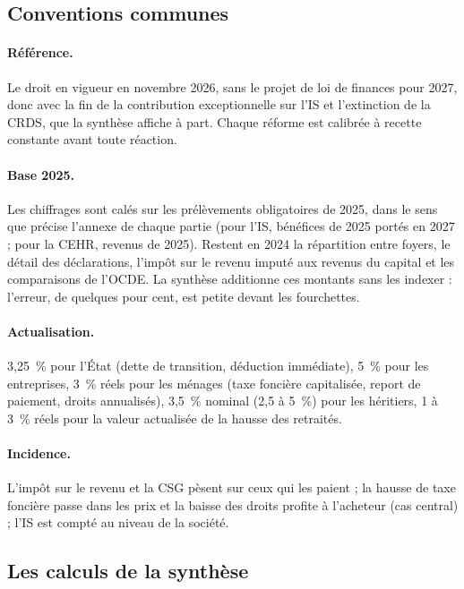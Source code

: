 \documentclass[11pt,a4paper]{article}
\begin{document}
\subsection{Conventions communes}\label{ann:meth_conv}

\paragraph{Référence.} Le droit en vigueur en novembre 2026, sans le projet de loi de finances pour 2027, donc avec la
fin de la contribution exceptionnelle sur l'IS et l'extinction de la CRDS, que la synthèse affiche à part. Chaque
réforme est calibrée à recette constante avant toute réaction.

\paragraph{Base 2025.} Les chiffrages sont calés sur les prélèvements obligatoires de 2025, dans le sens que précise
l'annexe de chaque partie (pour l'IS, bénéfices de 2025 portés en 2027 ; pour la CEHR, revenus de 2025). Restent en
2024 la répartition entre foyers, le détail des déclarations, l'impôt sur le revenu imputé aux revenus du capital et
les comparaisons de l'OCDE. La synthèse additionne ces montants sans les indexer : l'erreur, de quelques pour cent, est
petite devant les fourchettes.

\paragraph{Actualisation.} 3,25~\% pour l'État (dette de transition, déduction immédiate), 5~\% pour les entreprises,
3~\% réels pour les ménages (taxe foncière capitalisée, report de paiement, droits annualisés), 3,5~\% nominal (2,5 à
5~\%) pour les héritiers, 1 à 3~\% réels pour la valeur actualisée de la hausse des retraités.

\paragraph{Incidence.} L'impôt sur le revenu et la CSG pèsent sur ceux qui les paient ; la hausse de taxe foncière
passe dans les prix et la baisse des droits profite à l'acheteur (cas central) ; l'IS est compté au niveau de la
société.

\subsection{Les calculs de la synthèse}\label{ann:meth_synthese}
\end{document}

